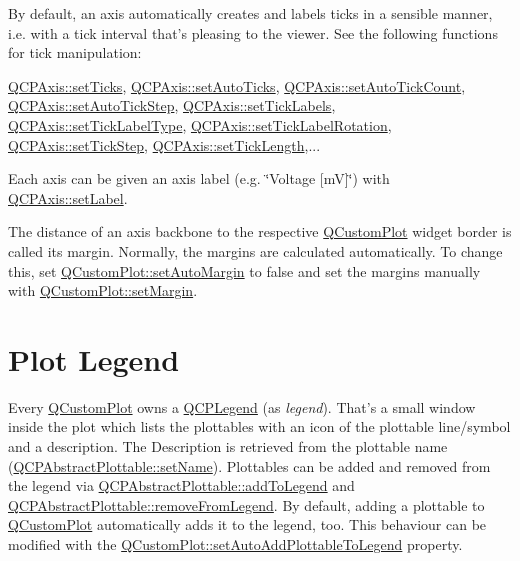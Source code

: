 By default, an axis automatically creates and labels ticks in a sensible manner, i.\-e. with a tick interval that's pleasing to the viewer. See the following functions for tick manipulation\-:\par
 \hyperlink{classQCPAxis_ac891409315bc379e3b1abdb162c1a011}{Q\-C\-P\-Axis\-::set\-Ticks}, \hyperlink{classQCPAxis_ae867c23d3a6a7bd4d09cc66c5d018f63}{Q\-C\-P\-Axis\-::set\-Auto\-Ticks}, \hyperlink{classQCPAxis_a7c7111cbeac9ec5fcb40f93a1ef51a0b}{Q\-C\-P\-Axis\-::set\-Auto\-Tick\-Count}, \hyperlink{classQCPAxis_a99fe77b034e06f5b723995beab96e741}{Q\-C\-P\-Axis\-::set\-Auto\-Tick\-Step}, \hyperlink{classQCPAxis_a04ba16e1f6f78d70f938519576ed32c8}{Q\-C\-P\-Axis\-::set\-Tick\-Labels}, \hyperlink{classQCPAxis_a54f24f5ce8feea25209388a863d7e448}{Q\-C\-P\-Axis\-::set\-Tick\-Label\-Type}, \hyperlink{classQCPAxis_a1bddd4413df8a576b7ad4b067fb33375}{Q\-C\-P\-Axis\-::set\-Tick\-Label\-Rotation}, \hyperlink{classQCPAxis_af727db0acc6492c4c774c0700e738205}{Q\-C\-P\-Axis\-::set\-Tick\-Step}, \hyperlink{classQCPAxis_a62ec40bebe3540e9c1479a8fd2be3b0d}{Q\-C\-P\-Axis\-::set\-Tick\-Length},...

Each axis can be given an axis label (e.\-g. \char`\"{}\-Voltage \mbox{[}m\-V\mbox{]}\char`\"{}) with \hyperlink{classQCPAxis_a33bcc382c111c9f31bb0687352a2dea4}{Q\-C\-P\-Axis\-::set\-Label}.

The distance of an axis backbone to the respective \hyperlink{classQCustomPlot}{Q\-Custom\-Plot} widget border is called its margin. Normally, the margins are calculated automatically. To change this, set \hyperlink{classQCustomPlot_aed5bb30c9b04c1d0103ab8ef7190f23a}{Q\-Custom\-Plot\-::set\-Auto\-Margin} to false and set the margins manually with \hyperlink{classQCustomPlot_a990cbcb1da0cc93ebb06ceea7366c129}{Q\-Custom\-Plot\-::set\-Margin}.\hypertarget{index_legend}{}\section{Plot Legend}\label{index_legend}
Every \hyperlink{classQCustomPlot}{Q\-Custom\-Plot} owns a \hyperlink{classQCPLegend}{Q\-C\-P\-Legend} (as {\itshape legend}). That's a small window inside the plot which lists the plottables with an icon of the plottable line/symbol and a description. The Description is retrieved from the plottable name (\hyperlink{classQCPAbstractPlottable_ab79c7ba76bc7fa89a4b3580e12149f1f}{Q\-C\-P\-Abstract\-Plottable\-::set\-Name}). Plottables can be added and removed from the legend via \hyperlink{classQCPAbstractPlottable_a70f8cabfd808f7d5204b9f18c45c13f5}{Q\-C\-P\-Abstract\-Plottable\-::add\-To\-Legend} and \hyperlink{classQCPAbstractPlottable_aa1f350e510326d012b9a9c9249736c83}{Q\-C\-P\-Abstract\-Plottable\-::remove\-From\-Legend}. By default, adding a plottable to \hyperlink{classQCustomPlot}{Q\-Custom\-Plot} automatically adds it to the legend, too. This behaviour can be modified with the \hyperlink{classQCustomPlot_ad8858410c2db47b7104040a3aa61c3fc}{Q\-Custom\-Plot\-::set\-Auto\-Add\-Plottable\-To\-Legend} property.

